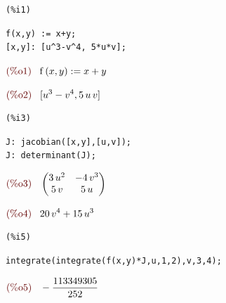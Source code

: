 \documentclass[12pt]{article}
\begin{document}
\noindent
\begin{minipage}[t]{8ex}{\color{red}\bf
\begin{verbatim}
(%i1) 
\end{verbatim}}
\end{minipage}
\begin{minipage}[t]{\textwidth}{\color{blue}
\begin{verbatim}
f(x,y) := x+y;
[x,y]: [u^3-v^4, 5*u*v];
\end{verbatim}}
\end{minipage}
\begin{math}\displaystyle
\parbox{8ex}{\color{labelcolor}(\%o1) }
\mathrm{f}\left( x,y\right) :=x+y
\end{math}

\begin{math}\displaystyle
\parbox{8ex}{\color{labelcolor}(\%o2) }
[{u}^{3}-{v}^{4},5\,u\,v]
\end{math}


\noindent
\begin{minipage}[t]{8ex}{\color{red}\bf
\begin{verbatim}
(%i3) 
\end{verbatim}}
\end{minipage}
\begin{minipage}[t]{\textwidth}{\color{blue}
\begin{verbatim}
J: jacobian([x,y],[u,v]);
J: determinant(J);
\end{verbatim}}
\end{minipage}
\begin{math}\displaystyle
\parbox{8ex}{\color{labelcolor}(\%o3) }
\begin{pmatrix}3\,{u}^{2} & -4\,{v}^{3}\cr 5\,v & 5\,u\end{pmatrix}
\end{math}

\begin{math}\displaystyle
\parbox{8ex}{\color{labelcolor}(\%o4) }
20\,{v}^{4}+15\,{u}^{3}
\end{math}


\noindent
\begin{minipage}[t]{8ex}{\color{red}\bf
\begin{verbatim}
(%i5) 
\end{verbatim}}
\end{minipage}
\begin{minipage}[t]{\textwidth}{\color{blue}
\begin{verbatim}
integrate(integrate(f(x,y)*J,u,1,2),v,3,4);
\end{verbatim}}
\end{minipage}
\begin{math}\displaystyle
\parbox{8ex}{\color{labelcolor}(\%o5) }
-\frac{113349305}{252}
\end{math}
\end{document}

